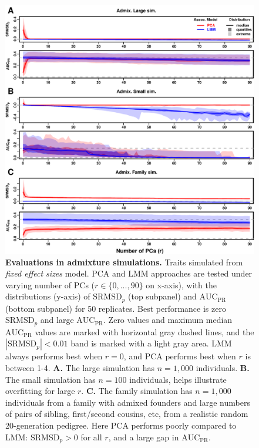 \documentclass[11pt]{article}
\newcommand{\rmsd}{\text{SRMSD}_p}
\newcommand{\auc}{\text{AUC}_\text{PR}}
\begin{document}
\begin{figure}[bp!]
  \centering
  \includegraphics[width=\textwidth,height=\textheight,keepaspectratio]{fes/rmsd-auc-sim.pdf}
  \caption{
    {\small 
      {\bf Evaluations in admixture simulations.}
      Traits simulated from \textit{fixed effect sizes} model.
      PCA and LMM approaches are tested under varying number of PCs ($r \in \{0, ..., 90\}$ on x-axis), with the distributions (y-axis) of $\rmsd$ (top subpanel) and $\auc$ (bottom subpanel) for 50 replicates.
      Best performance is zero $\rmsd$ and large $\auc$.
      Zero values and maximum median $\auc$ values are marked with horizontal gray dashed lines, and the $|\rmsd| < 0.01$ band is marked with a light gray area.
      LMM always performs best when $r=0$, and PCA performs best when $r$ is between 1-4.
      \textbf{A.}
      The large simulation has $n = 1,000$ individuals.
      \textbf{B.}
      The small simulation has $n = 100$ individuals, helps illustrate overfitting for large $r$.
      \textbf{C.}
      The family simulation has $n = 1,000$ individuals from a family with admixed founders and large numbers of pairs of sibling, first/second cousins, etc, from a realistic random 20-generation pedigree.
      Here PCA performs poorly compared to LMM: $\rmsd > 0$ for all $r$, and a large gap in $\auc$.
    }
  }
  \label{fig:rmsd-auc-sim}
\end{figure}
\end{document}

